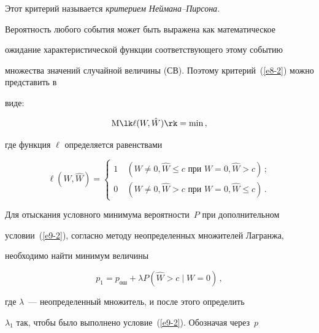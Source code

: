 Этот критерий называется \textit{критерием Ней\-ма\-на--Пир\-сона}.





Вероятность любого события может быть выражена как математическое


ожидание характеристической функции соответствующего этому событию


множества значений случайной величины (СВ). Поэтому критерий~(\ref{e8-2}) можно представить в


виде:


\begin{equation}


\mathrm{M} \lk \ell (W,\hat W)\rk =\min\,,\label{e10-2}


    \end{equation}


где функция  $\ell$ определяется равенствами


\begin{equation*}


\ell (W,\hat W) =


    \begin{cases}


    1\ &(W\ne 0,\hat W\le c\mbox{\ при\ } W=0, \hat W>c)\,;\\


    0\ &(W\ne 0,\hat W> c \mbox{\ при\ } W=0, \hat W\le c)\,.


    \end{cases}




    \end{equation*}





Для отыскания условного минимума вероятности~$P$ при дополнительном


условии~(\ref{e9-2}), согласно методу неопределенных множителей Лагранжа,


необходимо найти минимум величины


\begin{equation}


p_1 =p_{\mathrm{ош}} +\lambda P(\hat W >c \mid W=0)\,,


\label{e12-2}


\end{equation}


где  $\lambda$~--- неопределенный множитель, и после этого определить


$\lambda_1$ так, чтобы было выполнено условие~(\ref{e9-2}). Обозначая через~$p$ 


